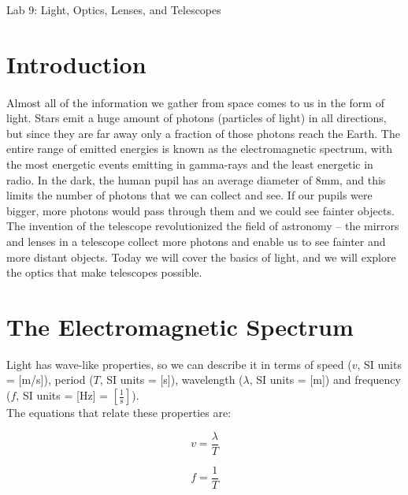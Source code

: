 \documentclass[12pt]{article}%
\begin{document}
 
\begin{center}
{\huge Lab 9: Light, Optics, Lenses, and Telescopes}\\
\end{center}
 
\medskip
 
\section*{Introduction}
 
\paragraph{}
Almost all of the information we gather from space comes to us in the form of light. Stars emit a huge amount of photons (particles of light) in all directions, but since they are far away only a fraction of those photons reach the Earth. The entire range of emitted energies is known as the electromagnetic spectrum, with the most energetic events emitting in gamma-rays and the least energetic in radio. In the dark, the human pupil has an average diameter of 8mm, and this limits the number of photons that we can collect and see. If our pupils were bigger, more photons would pass through them and we could see fainter objects. The invention of the telescope revolutionized the field of astronomy -- the mirrors and lenses in a telescope collect more photons and enable us to see fainter and more distant objects. Today we will cover the basics of light, and we will explore the optics that make telescopes possible.
 
\section{The Electromagnetic Spectrum}
Light has wave-like properties, so we can describe it in terms of speed ($v$, SI units = [m/s]), period ($T$, SI units = [s]), wavelength ($\lambda$, SI units = [m]) and frequency ($f$, SI units = [Hz] = $[\frac{1}{\textrm{s}}]$). \\
 
\noindent The equations that relate these properties are:
 
\begin{equation}
v=\frac{\lambda}{T}
\end{equation}
 
\begin{equation}
f=\frac{1}{T}
\end{equation}
 
\end{document}
